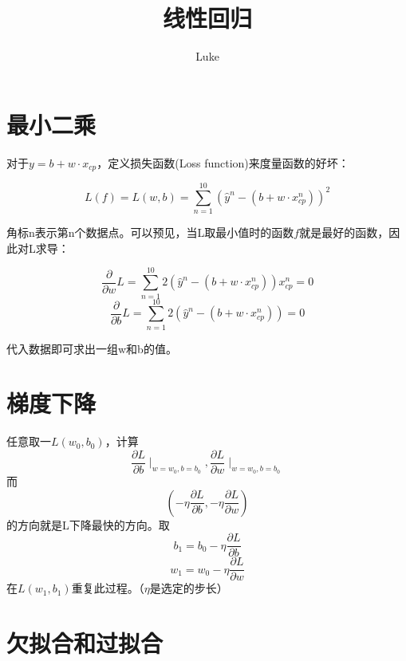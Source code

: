 \documentclass[UTF8,a4paper]{article}
\title{线性回归}
\author{Luke}
\begin{document}
\maketitle

\section{最小二乘}

对于$y=b+w\cdot x_{cp}$，定义损失函数(Loss function)来度量函数的好坏：

\begin{equation}
L(f)=L(w,b)=\sum^{10}_{n=1}(\hat{y}^n-(b+w\cdot x^{n}_{cp}))^2
\end{equation}

角标n表示第n个数据点。可以预见，当L取最小值时的函数$f$就是最好的函数，因此对L求导：

\begin{equation}
\frac{\partial}{\partial w}L=\sum^{10}_{n=1}2(\hat{y}^n-(b+w\cdot x^{n}_{cp}))x^{n}_{cp}=0
\end{equation}
\begin{equation}
\frac{\partial}{\partial b}L=\sum^{10}_{n=1}2(\hat{y}^n-(b+w\cdot x^{n}_{cp}))=0
\end{equation}

代入数据即可求出一组w和b的值。

\section{梯度下降}

任意取一$L(w_0,b_0)$，计算
\[\frac{\partial L}{\partial b}\mid _{w=w_0,b=b_0},\frac{\partial L}{\partial w}\mid _{w=w_0,b=b_0}\]
而
\[(-\eta\frac{\partial L}{\partial b},-\eta\frac{\partial L}{\partial w})\]
的方向就是L下降最快的方向。取
\[b_1=b_0-\eta\frac{\partial L}{\partial b}\]
\[w_1=w_0-\eta\frac{\partial L}{\partial w}\]
在$L(w_1,b_1)$重复此过程。（$\eta$是选定的步长）

\section{欠拟合和过拟合}
\end{document}
